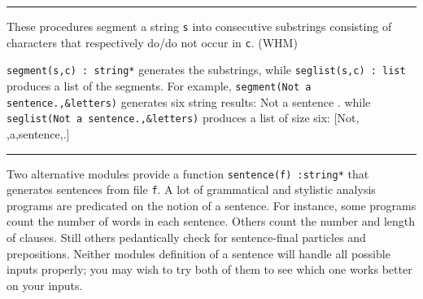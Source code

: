 
\vspace{0.25cm}\hrule{}

These procedures segment a string \texttt{s} into consecutive substrings
consisting of characters that respectively do/do not occur in
\texttt{c}. (WHM)

\texttt{segment(s,c)}\texttt{ : string*} generates
the substrings, while \texttt{seglist(s,c) : list} produces a list of
the segments. For example, \texttt{segment({\textquotedbl}Not a
sentence.{\textquotedbl},\&letters)} generates six string results:
{\textquotedbl}Not{\textquotedbl} {\textquotedbl} {\textquotedbl}
{\textquotedbl}a{\textquotedbl} {\textquotedbl} {\textquotedbl}
{\textquotedbl}sentence{\textquotedbl} {\textquotedbl}.{\textquotedbl}
while \texttt{seglist({\textquotedbl}Not a
sentence.{\textquotedbl},\&letters)} produces a list of size six:
[{\textquotedbl}Not{\textquotedbl},{\textquotedbl}
{\textquotedbl},{\textquotedbl}a{\textquotedbl},{\textquotedbl}sentence{\textquotedbl},{\textquotedbl}.{\textquotedbl}]


\vspace{0.25cm}\hrule{}

Two alternative modules provide a function \texttt{sentence(f) :string*}
that generates sentences from file
\texttt{f}. A lot of grammatical and stylistic analysis programs are
predicated on the notion of a sentence. For instance, some programs
count the number of words in each sentence. Others count the number and
length of clauses. Still others pedantically check for sentence-final
particles and prepositions. Neither module{\textquotesingle}s
definition of a sentence will handle all possible inputs properly; you
may wish to try both of them to see which one works better on your
inputs.

